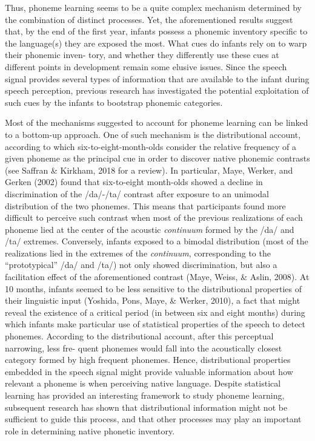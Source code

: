 \documentclass[man,floatsintext]{apa6}
\begin{document}
Thus, phoneme learning seems to be a quite complex mechanism determined by the combination of distinct processes. Yet, the aforementioned results suggest that, by the end of the first year, infants possess a phonemic inventory specific to the language(s) they are exposed the most. What cues do infants rely on to warp their phonemic inven- tory, and whether they differently use these cues at different points in development remain some elusive issues. Since the speech signal provides several types of information that are available to the infant during speech perception, previous research has investigated the potential exploitation of such cues by the infants to bootstrap phonemic categories.

Most of the mechanisms suggested to account for phoneme learning can be linked to a bottom-up approach. One of such mechanism is the distributional account, according to which six-to-eight-month-olds consider the relative frequency of a given phoneme as the principal cue in order to discover native phonemic contrasts (see Saffran \& Kirkham, 2018 for a review). In particular, Maye, Werker, and Gerken (2002) found that six-to-eight month-olds showed a decline in discrimination of the /da/-/ta/ contrast after exposure to an unimodal distribution of the two phonemes. This means that participants found more difficult to perceive such contrast when most of the previous realizations of each phoneme lied at the center of the acoustic \emph{continuum} formed by the /da/ and /ta/ extremes. Conversely, infants exposed to a bimodal distribution (most of the realizations lied in the extremes of the \emph{continuum}, corresponding to the \enquote{prototypical} /da/ and /ta/) not only showed discrimination, but also a facilitation effect of the aforementioned contrast (Maye, Weiss, \& Aslin, 2008). At 10 months, infants seemed to be less sensitive to the distributional properties of their linguistic input (Yoshida, Pons, Maye, \& Werker, 2010), a fact that might reveal the existence of a critical period (in between six and eight months) during which infants make particular use of statistical properties of the speech to detect phonemes. According to the distributional account, after this perceptual narrowing, less fre- quent phonemes would fall into the acoustically closest category formed by high frequent phonemes. Hence, distributional properties embedded in the speech signal might provide valuable information about how relevant a phoneme is when perceiving native language. Despite statistical learning has provided an interesting framework to study phoneme learning, subsequent research has shown that distributional information might not be sufficient to guide this process, and that other processes may play an important role in determining native phonetic inventory.
\end{document}
